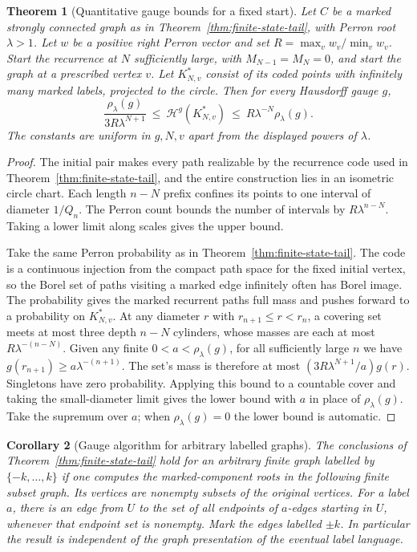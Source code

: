 \documentclass[11pt]{article}
\newtheorem{theorem}{Theorem}
\newtheorem{corollary}[theorem]{Corollary}
\theoremstyle{definition}
\theoremstyle{remark}
\begin{document}
\begin{theorem}[Quantitative gauge bounds for a fixed start]\label{thm:finite-state-quant}
Let $C$ be a marked strongly connected graph as in
Theorem~\ref{thm:finite-state-tail}, with Perron root $\lambda>1$.
Let $w$ be a positive right Perron vector and set
$R=\max_v w_v/\min_v w_v$.
Start the recurrence at $N$ sufficiently large, with
$M_{N-1}=M_N=0$, and start the graph at a prescribed vertex $v$.
Let $K^*_{N,v}$ consist of its coded points with infinitely many
marked labels, projected to the circle. Then for every Hausdorff gauge $g$,
\[
 \frac{\rho_\lambda(g)}{3R\lambda^{N+1}}
 \ \le\ \mathcal H^g(K^*_{N,v})
 \ \le\ R\lambda^{-N}\rho_\lambda(g).
\]
The constants are uniform in $g,N,v$ apart from the displayed powers
of $\lambda$.
\end{theorem}

\begin{proof}
The initial pair makes every path realizable by the recurrence code
used in Theorem~\ref{thm:finite-state-tail}, and the entire construction
lies in an isometric circle chart. Each length $n-N$ prefix confines
its points to one interval of diameter $1/Q_n$. The Perron count
bounds the number of intervals by $R\lambda^{n-N}$.
Taking a lower limit along scales gives the upper bound.

Take the same Perron probability as in Theorem~\ref{thm:finite-state-tail}.
The code is a continuous injection from the compact path space for the
fixed initial vertex, so the Borel set of paths visiting a marked edge
infinitely often has Borel image.
The probability gives the marked recurrent paths full mass and pushes
forward to a probability on $K^*_{N,v}$. At any diameter $r$ with
$r_{n+1}\le r<r_n$, a covering set meets at most three depth $n-N$
cylinders, whose masses are each at most $R\lambda^{-(n-N)}$.
Given any finite $0<a<\rho_\lambda(g)$, for all sufficiently large
$n$ we have $g(r_{n+1})\ge a\lambda^{-(n+1)}$. The set's mass is
therefore at most $(3R\lambda^{N+1}/a)g(r)$.
Singletons have zero probability. Applying this bound to a countable
cover and taking the small-diameter limit gives the lower bound with
$a$ in place of $\rho_\lambda(g)$. Take the supremum over $a$;
when $\rho_\lambda(g)=0$ the lower bound is automatic.
\end{proof}

\begin{corollary}[Gauge algorithm for arbitrary labelled graphs]\label{cor:finite-state-nondet}
The conclusions of Theorem~\ref{thm:finite-state-tail} hold for an
arbitrary finite graph labelled by $\{-k,\ldots,k\}$ if one computes
the marked-component roots in the following finite subset graph.
Its vertices are nonempty subsets of the original vertices. For a
label $a$, there is an edge from $U$ to the set of all endpoints of
$a$-edges starting in $U$, whenever that endpoint set is nonempty.
Mark the edges labelled $\pm k$. In particular the result is
independent of the graph presentation of the eventual label language.
\end{corollary}
\end{document}
